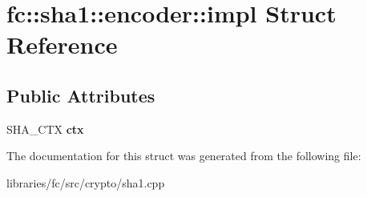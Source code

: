 \hypertarget{structfc_1_1sha1_1_1encoder_1_1impl}{}\section{fc\+:\+:sha1\+:\+:encoder\+:\+:impl Struct Reference}
\label{structfc_1_1sha1_1_1encoder_1_1impl}
\subsection*{Public Attributes}
\begin{DoxyCompactItemize}
\item 
\mbox{\label{structfc_1_1sha1_1_1encoder_1_1impl_ab38d54c42316b3239ab8c6cced6f299c}} 
S\+H\+A\+\_\+\+C\+TX {\bfseries ctx}
\end{DoxyCompactItemize}


The documentation for this struct was generated from the following file\+:\begin{DoxyCompactItemize}
\item 
libraries/fc/src/crypto/sha1.\+cpp\end{DoxyCompactItemize}
